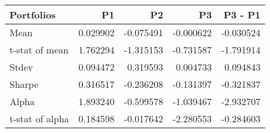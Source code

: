 \begin{tabular}{lrrrr}
\toprule
Portfolios & P1 & P2 & P3 & P3 - P1 \\
\midrule
Mean & 0.029902 & -0.075491 & -0.000622 & -0.030524 \\
t-stat of mean & 1.762294 & -1.315153 & -0.731587 & -1.791914 \\
Stdev & 0.094472 & 0.319593 & 0.004733 & 0.094843 \\
Sharpe & 0.316517 & -0.236208 & -0.131397 & -0.321837 \\
Alpha & 1.893240 & -0.599578 & -1.039467 & -2.932707 \\
t-stat of alpha & 0.184598 & -0.017642 & -2.280553 & -0.284603 \\
\bottomrule
\end{tabular}
